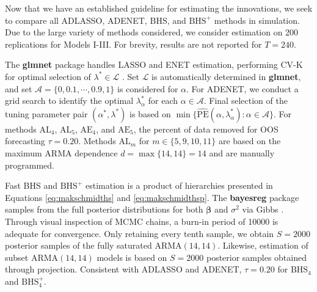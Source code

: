 Now that we have an established guideline for estimating the innovations, we seek to compare all ADLASSO, ADENET, BHS, and $\textrm{BHS}^+$ methods in simulation. Due to the large variety of methods considered, we consider estimation on 200 replications for Models I-III. For brevity, results are not reported for $T=240$.

The {\bf glmnet} package handles LASSO and ENET estimation, performing CV-K for optimal selection of $\lambda^* \in \mathcal{L}$ \citep{glmnet}. Set $\mathcal{L}$ is automatically determined in {\bf glmnet}, and set $\mathcal{A}=\{0,0.1,\cdots,0.9,1\}$ is considered for $\alpha$. For ADENET, we conduct a grid search to identify the optimal $\lambda^*_\alpha$ for each $\alpha \in \mathcal{A}$. Final selection of the tuning parameter pair $(\alpha^*,\lambda^*)$ is based on $\min\{\widehat{\textrm{PE}}(\alpha,\lambda^*_\alpha):\alpha \in \mathcal{A}\}$. For methods $\textrm{AL}_{4}$, $\textrm{AL}_{5}$, $\textrm{AE}_{4}$, and $\textrm{AE}_{5}$, the percent of data removed for OOS forecasting $\tau=0.20$. Methods $\textrm{AL}_{m}$ for $m\in\{5,9,10,11\}$ are based on the maximum ARMA dependence $d=\max\{14,14\}=14$ and are manually programmed.

Fast BHS and $\textrm{BHS}^+$ estimation is a product of hierarchies presented in Equations \ref{eq:makschmidths} and \ref{eq:makschmidthsp}. The {\bf bayesreg} package samples from the full posterior distributions for both $\bm{\beta}$ and $\sigma^2$ via Gibbs \citep{bayesreg}. Through visual inspection of MCMC chains, a burn-in period of 10000 is adequate for convergence. Only retaining every tenth sample, we obtain $S=2000$ posterior samples of the fully saturated ARMA$(14,14)$. Likewise, estimation of subset ARMA$(14,14)$ models is based on $S=2000$ posterior samples obtained through projection.  Consistent with ADLASSO and ADENET, $\tau=0.20$ for $\textrm{BHS}_{4}$ and $\textrm{BHS}^+_{4}$.

